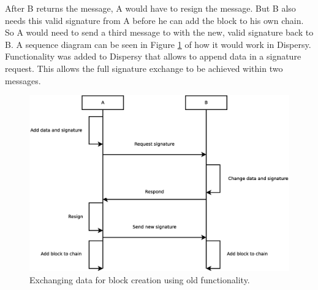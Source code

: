 After B returns the message,
A would have to resign the message.
But B also needs this valid signature from A before he can add the block to his own chain.
So A would need to send a third message to with the new, valid signature back to B.
A sequence diagram can be seen in Figure \ref{fig:exchange-old-sequence} of how it would work in Dispersy.
Functionality was added to Dispersy that allows to append data in a signature request.
This allows the full signature exchange to be achieved within two messages.

\begin{figure}
	\centerline{\includegraphics[scale=0.3]{design/figs/exchange_old.eps}}
	\caption{Exchanging data for block creation using old functionality.}
	\label{fig:exchange-old-sequence}
\end{figure}
